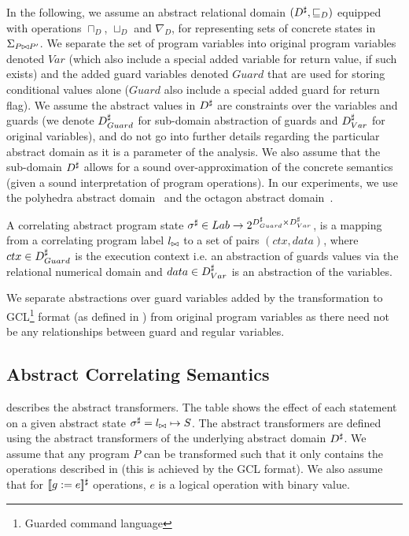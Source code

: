In the following, we assume an abstract relational domain $(D^\sharp, \sqsubseteq_{D})$ equipped with operations $\sqcap_{D}$, $\sqcup_{D}$ and $\nabla_{D}$, for representing sets of concrete states in $\Sigma_{P \bowtie P'}$. We separate the set of program variables into original program variables denoted $Var$ (which also include a special added variable for return value, if such exists) and the added guard variables denoted $Guard$ that are used for storing conditional values alone ($Guard$ also include a special added guard for return flag). We assume the abstract values in $D^\sharp$ are constraints over the variables and guards (we denote $D^\sharp_{Guard}$ for sub-domain abstraction of guards and $D^\sharp_{Var}$ for original variables), and do not go into further details regarding the particular abstract domain as it is a parameter of the analysis. We also assume that the sub-domain $D^\sharp$ allows for a sound over-approximation of the concrete semantics (given a sound interpretation of program operations). In our experiments, we use the polyhedra abstract domain~\cite{CousotHalbwachs78} and the octagon abstract domain~\cite{Mine2006}.

\begin{definition} 
A correlating abstract program state $\sigma^\sharp \in Lab \rightarrow 2^{D^\sharp_{Guard} \times D^\sharp_{Var}}$, is a mapping from a correlating program label $l_{\bowtie}$ to a set of pairs $(ctx, data)$, where $ctx \in D^\sharp_{Guard}$ is the execution context i.e. an abstraction of guards values via the relational numerical domain and $data \in D^\sharp_{Var}$ is an abstraction of the variables. 
\end{definition}

We separate abstractions over guard variables added by the transformation to GCL\footnote{Guarded command language} format (as defined in ) from original program variables as there need not be any relationships between guard and regular variables.

\subsection{Abstract Correlating Semantics}



 describes the abstract transformers. The table shows the effect of each statement on a given abstract state $\sigma^\sharp = l_{\bowtie} \mapsto S$. The abstract transformers are defined using the abstract transformers of the underlying abstract domain $D^\sharp$. We assume that any program $P$ can be transformed such that it only contains the operations described in  (this is achieved by the GCL format). We also assume that for $\lbrack\!\lbrack g:=e \rbrack\!\rbrack^{\sharp}$ operations, $e$ is a logical operation with binary value.

